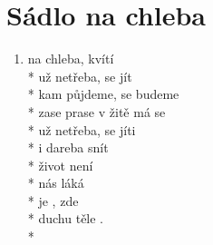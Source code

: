 \section{Sádlo na chleba}
\begin{enumerate}
\item[]  na chleba, kvítí \\*
 už netřeba,  se jít \\*
kam půjdeme,  se budeme \\*
 zase   prase v žitě má se \\*
 už netřeba,  se jíti \\*
 i dareba  snít \\*
 život není  \\*
 nás láká  \\*
 je ,  zde  \\*
 duchu  těle . \\*
\end{enumerate}
